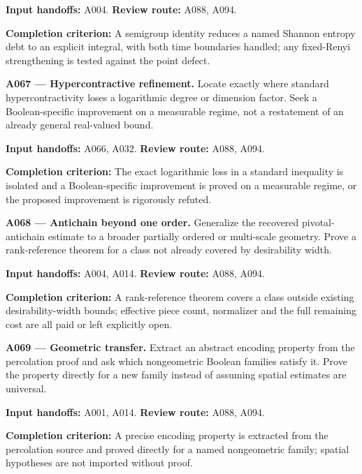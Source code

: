 \documentclass[11pt]{article}
\begin{document}
{\small\color{ink}\textbf{Input handoffs:} A004. \textbf{Review route:} A088, A094.\par
\textbf{Completion criterion:} A semigroup identity reduces a named Shannon entropy debt to an explicit integral, with both time boundaries handled; any fixed-Renyi strengthening is tested against the point defect.\par}



\textbf{A067 --- Hypercontractive refinement.} Locate exactly where standard hypercontractivity loses a logarithmic degree or dimension factor. Seek a Boolean-specific improvement on a measurable regime, not a restatement of an already general real-valued bound.

{\small\color{ink}\textbf{Input handoffs:} A066, A032. \textbf{Review route:} A088, A094.\par
\textbf{Completion criterion:} The exact logarithmic loss in a standard inequality is isolated and a Boolean-specific improvement is proved on a measurable regime, or the proposed improvement is rigorously refuted.\par}



\textbf{A068 --- Antichain beyond one order.} Generalize the recovered pivotal-antichain estimate to a broader partially ordered or multi-scale geometry. Prove a rank-reference theorem for a class not already covered by desirability width.

{\small\color{ink}\textbf{Input handoffs:} A004, A014. \textbf{Review route:} A088, A094.\par
\textbf{Completion criterion:} A rank-reference theorem covers a class outside existing desirability-width bounds; effective piece count, normalizer and the full remaining cost are all paid or left explicitly open.\par}



\textbf{A069 --- Geometric transfer.} Extract an abstract encoding property from the percolation proof and ask which nongeometric Boolean families satisfy it. Prove the property directly for a new family instead of assuming spatial estimates are universal.

{\small\color{ink}\textbf{Input handoffs:} A001, A014. \textbf{Review route:} A088, A094.\par
\textbf{Completion criterion:} A precise encoding property is extracted from the percolation source and proved directly for a named nongeometric family; spatial hypotheses are not imported without proof.\par}
\end{document}
